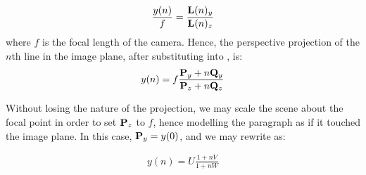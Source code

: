 \begin{eqnarray}
\frac{y(n)}{f}  = \frac{ { \bf L }(n)_y }{ { \bf L }(n)_z }  \label{spacingspq1}
\end{eqnarray}
{\parindent 0mm
where $f$ is the focal length of the camera. Hence, the perspective projection
of the  $n$th line in the image plane, after substituting  into
, is: 
}
\begin{eqnarray}
y(n) =  f \frac{ { \bf P }_y + n { \bf Q }_y }{ { \bf P }_z + n{ \bf Q }_z } \label{spacingspq}
\end{eqnarray}

{\parindent 0mm
Without losing the nature of the projection, we may scale the scene about the focal point in order to set ${ \bf P }_z$ to $f$, hence modelling the paragraph as if it touched the image plane.  In this case, ${ \bf P }_y=y(0)$,
and we may rewrite  as:
}

\begin{eqnarray}
y(n) = U \frac{ 1 + nV }{ 1 + nW } \label{spacingsvweqn}
\end{eqnarray}

